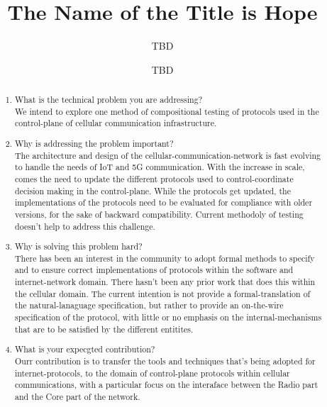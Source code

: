 \documentclass[acmsmall,review,authorversion]{acmart}
\begin{document}
\title{The Name of the Title is Hope}

\author{TBD}
\author{TBD}


\begin{abstract}
\begin{enumerate}
  \item What is the technical problem you are addressing?\\
  We intend to explore one method of compositional testing of protocols used in the control-plane of cellular communication infrastructure. 
  \item Why is addressing the problem important? \\
The architecture and design of the cellular-communication-network is fast evolving to handle the needs of IoT and 5G communication. With the increase in scale, comes the need to update the different protocols used to control-coordinate decision making in the control-plane. While the protocols get updated, the implementations of the protocols need to be evaluated for compliance with older versions, for the sake of backward compatibility. Current methodoly of testing doesn't help to address this challenge. 
\item Why is solving this problem hard? \\
There has been an interest in the community to adopt formal methods to specify and to ensure correct implementations of protocols within the software and internet-network domain. There hasn't been any prior work that does this within the cellular domain. The current intention is not provide a formal-translation of the natural-lanaguage specification, but rather to provide an on-the-wire specification of the protocol, with little or no emphasis on the internal-mechanisms that are to be satisfied by the different entitites. 
\item What is your expecgted contribution?\\
Ourr contribution is to transfer the tools and techniques that's being adopted for internet-protocols, to the domain of control-plane protocols within cellular communications, with a particular focus on the interaface between the Radio part and the Core part of the network. 
\end{enumerate}
\end{abstract}
\end{document}
